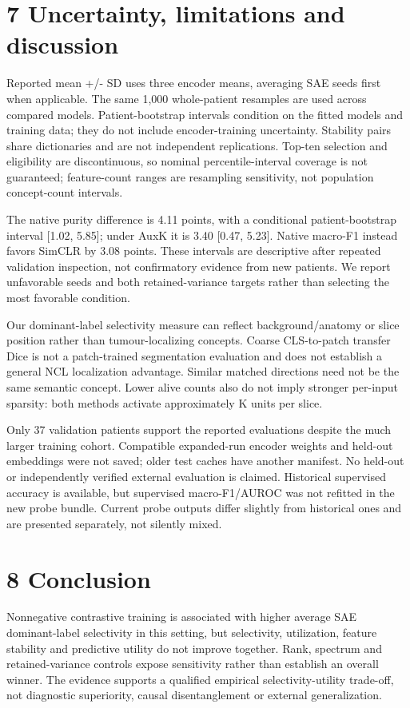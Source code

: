\documentclass[10pt]{article}
\begin{document}
\clearpage
\section*{7  Uncertainty, limitations and discussion}
Reported mean +/- SD uses three encoder means, averaging SAE seeds first when applicable. The same 1,000 whole-patient resamples are used across compared models. Patient-bootstrap intervals condition on the fitted models and training data; they do not include encoder-training uncertainty. Stability pairs share dictionaries and are not independent replications. Top-ten selection and eligibility are discontinuous, so nominal percentile-interval coverage is not guaranteed; feature-count ranges are resampling sensitivity, not population concept-count intervals.

The native purity difference is 4.11 points, with a conditional patient-bootstrap interval [1.02, 5.85]; under AuxK it is 3.40 [0.47, 5.23]. Native macro-F1 instead favors SimCLR by 3.08 points. These intervals are descriptive after repeated validation inspection, not confirmatory evidence from new patients. We report unfavorable seeds and both retained-variance targets rather than selecting the most favorable condition.

Our dominant-label selectivity measure can reflect background/anatomy or slice position rather than tumour-localizing concepts. Coarse CLS-to-patch transfer Dice is not a patch-trained segmentation evaluation and does not establish a general NCL localization advantage. Similar matched directions need not be the same semantic concept. Lower alive counts also do not imply stronger per-input sparsity: both methods activate approximately K units per slice.

Only 37 validation patients support the reported evaluations despite the much larger training cohort. Compatible expanded-run encoder weights and held-out embeddings were not saved; older test caches have another manifest. No held-out or independently verified external evaluation is claimed. Historical supervised accuracy is available, but supervised macro-F1/AUROC was not refitted in the new probe bundle. Current probe outputs differ slightly from historical ones and are presented separately, not silently mixed.

\section*{8  Conclusion}
Nonnegative contrastive training is associated with higher average SAE dominant-label selectivity in this setting, but selectivity, utilization, feature stability and predictive utility do not improve together. Rank, spectrum and retained-variance controls expose sensitivity rather than establish an overall winner. The evidence supports a qualified empirical selectivity-utility trade-off, not diagnostic superiority, causal disentanglement or external generalization.
\end{document}
